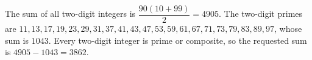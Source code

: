 The sum of all two-digit integers is $\dfrac{90(10+99)}{2}=4905$. The two-digit primes are $11,13,17,19,23,29,31,37,41,43,47,53,59,61,67,71,73,79,83,89,97$, whose sum is $1043$. Every two-digit integer is prime or composite, so the requested sum is $4905-1043=\boxed{3862}$.
